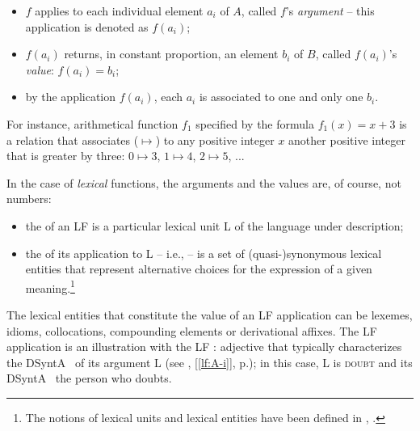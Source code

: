 \begin{itemize}

\item $f$ applies to each individual element $a_i$ of $A$, called $f$'s \emph{argument} -- this application is denoted as $f(a_i)$;

\item $f(a_i)$ returns, in constant proportion, an element $b_i$ of $B$, called $f(a_i)$'s \emph{value}: $f(a_i) = b_i$;

\item by the application $f(a_i)$, each $a_i$ is associated to one and only one $b_i$.

\end{itemize}

For instance, arithmetical function $f_1$ specified by the formula $f_1(x) = x + 3$ is a relation that associates ($\mapsto$) to any positive integer $x$ another positive integer that is greater by three: $0 \mapsto 3$, $1 \mapsto 4$, $2 \mapsto 5$, ...

In the case of \emph{lexical} functions, the arguments and the values are, of course, not numbers:

\begin{itemize}

\item the  of an LF  is a particular lexical unit L of the language under description;

\item {}\label{txt:valueOfAnLF}the  of its application to L -- i.e.,  -- is a set of (quasi-)synonymous lexical entities that represent alternative choices for the expression of a given meaning.\footnote{The notions of lexical units and lexical entities have been defined in , .}

\end{itemize}

The lexical entities that constitute the value of an LF application can be lexemes, idioms, collocations, compounding elements or derivational affixes. The LF application \Next is an illustration with the LF : adjective that typically characterizes the DSyntA~ of its argument L (see , [\ref{lf:A-i}], p.\thinspace\pageref{lf:A-i}); in this case, L is \textsc{doubt} and its DSyntA~ the person who doubts.

